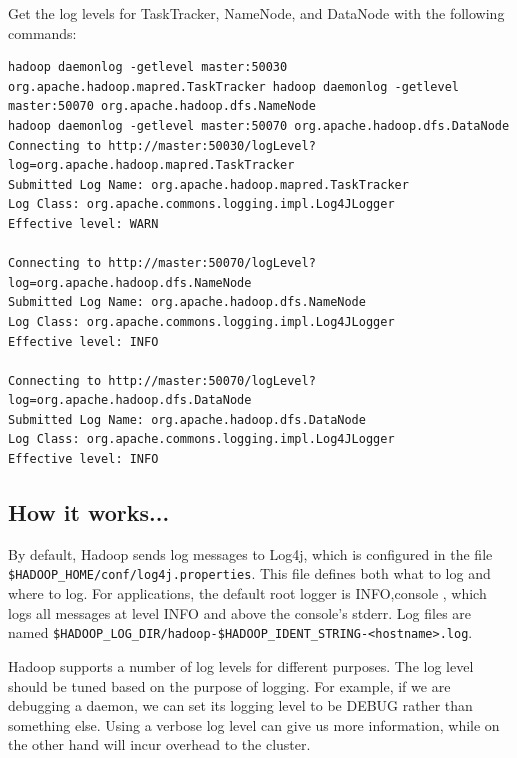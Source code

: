 Get the log levels for TaskTracker, NameNode, and DataNode with the following commands:
\lstset{style=bashstyle}
\begin{lstlisting}
hadoop daemonlog -getlevel master:50030 org.apache.hadoop.mapred.TaskTracker hadoop daemonlog -getlevel master:50070 org.apache.hadoop.dfs.NameNode
hadoop daemonlog -getlevel master:50070 org.apache.hadoop.dfs.DataNode
Connecting to http://master:50030/logLevel?log=org.apache.hadoop.mapred.TaskTracker
Submitted Log Name: org.apache.hadoop.mapred.TaskTracker
Log Class: org.apache.commons.logging.impl.Log4JLogger
Effective level: WARN

Connecting to http://master:50070/logLevel?log=org.apache.hadoop.dfs.NameNode
Submitted Log Name: org.apache.hadoop.dfs.NameNode
Log Class: org.apache.commons.logging.impl.Log4JLogger
Effective level: INFO

Connecting to http://master:50070/logLevel?log=org.apache.hadoop.dfs.DataNode
Submitted Log Name: org.apache.hadoop.dfs.DataNode
Log Class: org.apache.commons.logging.impl.Log4JLogger
Effective level: INFO
\end{lstlisting}

\subsection*{How it works...}
By default, Hadoop sends log messages to Log4j, which is configured in the file \verb|$HADOOP_HOME/conf/log4j.properties|. This file defines both what to log and where to log. For applications, the default root logger is INFO,console , which logs all messages at level INFO and above the console's stderr. Log files are named \verb|$HADOOP_LOG_DIR/hadoop-$HADOOP_IDENT_STRING-<hostname>.log|.

Hadoop supports a number of log levels for different purposes. The log level should be tuned based on the purpose of logging. For example, if we are debugging a daemon, we can set its logging level to be DEBUG rather than something else. Using a verbose log level can give us more information, while on the other hand will incur overhead to the cluster.

